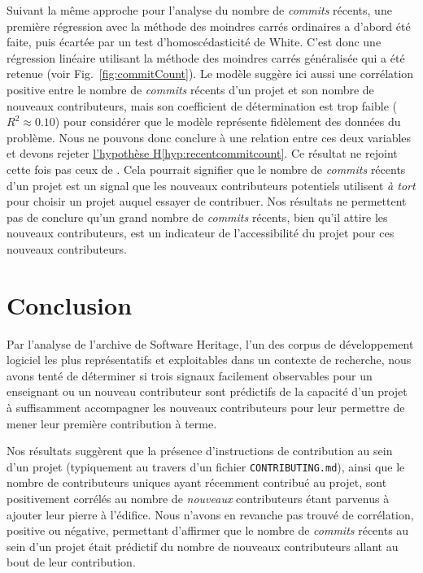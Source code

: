 \documentclass[dvipsnames,runningheads]{llncs}
\newcommand{\en}[1]{\foreignlanguage{english}{\emph{#1}}}
\begin{document}
    Suivant la même approche pour l'analyse du nombre de \en{commits} récents, une première régression avec la
    méthode des moindres carrés ordinaires a d'abord été faite, puis écartée par un test d'homoscédasticité de
    White. C'est donc une régression linéaire utilisant la méthode des moindres carrés généralisée qui a été
    retenue (voir Fig.~\ref{fig:commitCount}). Le modèle suggère ici aussi une corrélation positive entre le
    nombre de \en{commits} récents d'un projet et son nombre de nouveaux contributeurs, mais son coefficient
    de détermination est trop faible ($R^2 \approx 0.10$) pour considérer que le modèle représente fidèlement
    des données du problème. Nous ne pouvons donc conclure à une relation entre ces deux variables et devons
    rejeter \hyperref[hyp:recentcommitcount]{l'hypothèse H\ref*{hyp:recentcommitcount}}. Ce résultat ne
    rejoint cette fois pas ceux de \textcite[p.~13,16]{signals-2019}. Cela pourrait signifier que le nombre de
    \en{commits} récents d'un projet est un signal que les nouveaux contributeurs potentiels utilisent \emph{à
    tort} pour choisir un projet auquel essayer de contribuer. Nos résultats ne permettent pas de conclure
    qu'un grand nombre de \en{commits} récents, bien qu'il attire les nouveaux contributeurs, est un
    indicateur de l'accessibilité du projet pour ces nouveaux contributeurs.

    \section{Conclusion}

    Par l'analyse de l'archive de Software Heritage, l'un des corpus de développement logiciel les plus
    représentatifs et exploitables dans un contexte de recherche, nous avons tenté de déterminer si trois
    signaux facilement observables pour un enseignant ou un nouveau contributeur sont prédictifs de la
    capacité d'un projet à suffisamment accompagner les nouveaux contributeurs pour leur permettre de mener
    leur première contribution à terme.

    Nos résultats suggèrent que la présence d'instructions de contribution au sein d'un projet (typiquement au
    travers d'un fichier \texttt{CONTRIBUTING.md}), ainsi que le nombre de contributeurs uniques ayant
    récemment contribué au projet, sont positivement corrélés au nombre de \emph{nouveaux} contributeurs étant
    parvenus à ajouter leur pierre à l'édifice. Nous n'avons en revanche pas trouvé de corrélation, positive
    ou négative, permettant d'affirmer que le nombre de \en{commits} récents au sein d'un projet était
    prédictif du nombre de nouveaux contributeurs allant au bout de leur contribution.
\end{document}
